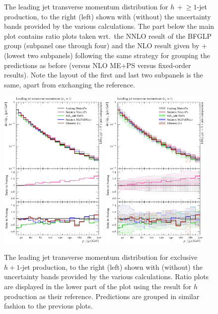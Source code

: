 \begin{figure}[t!]
  \caption{\label{fig:hjetscomp:results:1obs:j1pt}%
    The leading jet transverse momentum distribution for
    $h\,+\!\ge\!\!1$-jet production, to the right (left) shown with
    (without) the uncertainty bands provided by the various
    calculations. The part below the main plot contains ratio plots
    taken wrt.~the NNLO result of the BFGLP group (subpanel one
    through four) and the NLO result given by \GoSam{}+\Sherpa (lowest
    two subpanels) following the same strategy for grouping the
    predictions as before (\NNLOPS versus NLO ME+PS versus fixed-order
    results). Note the layout of the first and last two subpanels is
    the same, apart from exchanging the reference.}
\end{figure}

\begin{figure}[t!]
  \centering
  \includegraphics[width=0.47\textwidth]{figures/hjetscomp_u_jet1_pT_excl.pdf}
  \hfill
  \includegraphics[width=0.47\textwidth]{figures/hjetscomp_jet1_pT_excl.pdf}
  \caption{\label{fig:hjetscomp:results:1obs:j1pt_excl}%
    The leading jet transverse momentum distribution for exclusive
    $h+1$-jet production, to the right (left) shown with (without)
    the uncertainty bands provided by the various calculations. Ratio
    plots are displayed in the lower part of the plot using the
    \Powheg \NNLOPS result for $h$ production as their reference.
    Predictions are grouped in similar fashion to the previous plots.}
\end{figure}

